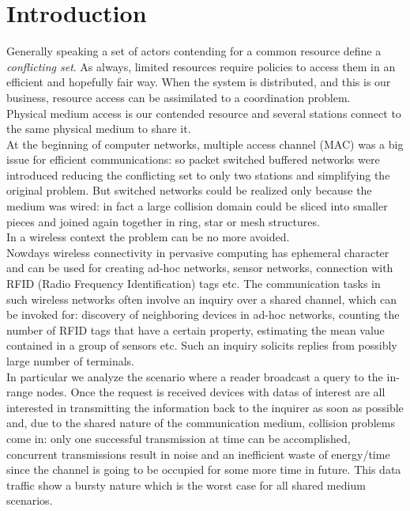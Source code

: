 \documentclass[12pt,a4paper]{report}
\title{}
\begin{document}


\tableofcontents


\chapter{Introduction}

Generally speaking a set of actors contending for a common resource define a \emph{conflicting set}. As always, limited resources require policies to access them in an efficient and hopefully fair way. When the system is distributed, and this is our business, resource access can be assimilated to a coordination problem.\\ 
Physical medium access is our contended resource and several stations connect to the same physical medium to share it.\\ At the beginning of computer networks, multiple access channel (MAC) was a big issue for efficient communications: so packet switched buffered networks were introduced reducing the conflicting set to only two stations and simplifying  the original problem. But switched networks could be realized only because the medium was wired: in fact a large collision domain could be sliced into smaller pieces and joined again together in ring, star or mesh structures.\\ 
In a wireless context the problem can be no more avoided.\\  

Nowdays wireless connectivity in pervasive computing has ephemeral character and can be used for creating ad-hoc networks, sensor networks, connection with RFID (Radio Frequency Identification) tags etc. The communication tasks in such wireless networks often involve an inquiry over a shared channel, which can be invoked for: discovery of neighboring devices in ad-hoc networks, counting the number of RFID tags that have a certain property, estimating the mean value contained in a group of sensors etc. Such an inquiry solicits replies from possibly large number of terminals.\\

In particular we analyze the scenario where a reader broadcast a query to the in-range nodes. Once the request is received devices with datas of interest are all interested in transmitting the information back to the inquirer as soon as possible and, due to the shared nature of the communication medium, collision problems come in: only one successful transmission at time can be accomplished, concurrent transmissions result in noise and an inefficient waste of energy/time since the channel is going to be occupied for some more time in future. This data traffic show a bursty nature which is the worst case for all shared medium scenarios.\\
\end{document}
